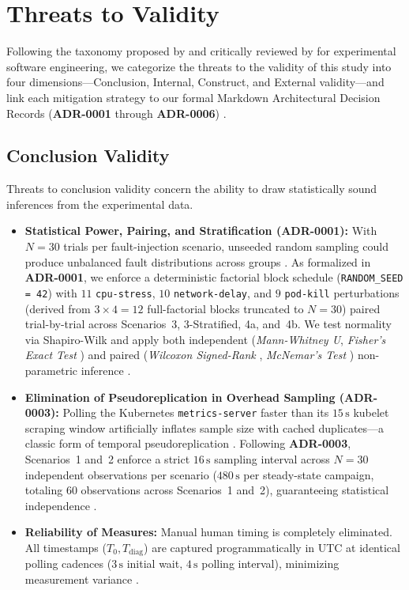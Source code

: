 \section{Threats to Validity}
\label{sec:threats-to-validity}

Following the taxonomy proposed by \cite{wohlin_2012} and critically reviewed by \cite{verdecchia_2023} for experimental software engineering, we categorize the threats to the validity of this study into four dimensions---Conclusion, Internal, Construct, and External validity---and link each mitigation strategy to our formal Markdown Architectural Decision Records (\textbf{ADR-0001} through \textbf{ADR-0006}) \cite{nygard_2011, kopp_2018}.

\subsection{Conclusion Validity}
Threats to conclusion validity concern the ability to draw statistically sound inferences from the experimental data.
\begin{itemize}
    \item \textbf{Statistical Power, Pairing, and Stratification (ADR-0001):} With $N=30$ trials per fault-injection scenario, unseeded random sampling could produce unbalanced fault distributions across groups \cite{wohlin_2012}. As formalized in \textbf{ADR-0001}, we enforce a deterministic factorial block schedule (\texttt{RANDOM\_SEED = 42}) with $11$ \texttt{cpu-stress}, $10$ \texttt{network-delay}, and $9$ \texttt{pod-kill} perturbations (derived from $3 \times 4 = 12$ full-factorial blocks truncated to $N=30$) paired trial-by-trial across Scenarios~3, 3-Stratified, 4a, and~4b. We test normality via Shapiro-Wilk and apply both independent (\textit{Mann-Whitney U}, \textit{Fisher's Exact Test} \cite{agresti_2007}) and paired (\textit{Wilcoxon Signed-Rank} \cite{wilcoxon_1945}, \textit{McNemar's Test} \cite{mcnemar_1947}) non-parametric inference \cite{conover_1999}.
    \item \textbf{Elimination of Pseudoreplication in Overhead Sampling (ADR-0003):} Polling the Kubernetes \texttt{metrics-server} faster than its $15\,\text{s}$ kubelet scraping window artificially inflates sample size with cached duplicates---a classic form of temporal pseudoreplication \cite{hurlbert_1984}. Following \textbf{ADR-0003}, Scenarios~1 and~2 enforce a strict $16\,\text{s}$ sampling interval across $N=30$ independent observations per scenario ($480\,\text{s}$ per steady-state campaign, totaling $60$ observations across Scenarios~1 and~2), guaranteeing statistical independence \cite{jain_1991, georges_2007}.
    \item \textbf{Reliability of Measures:} Manual human timing is completely eliminated. All timestamps ($T_0, T_{\text{diag}}$) are captured programmatically in UTC at identical polling cadences ($3\,\text{s}$ initial wait, $4\,\text{s}$ polling interval), minimizing measurement variance \cite{kitchenham_2002}.
\end{itemize}

